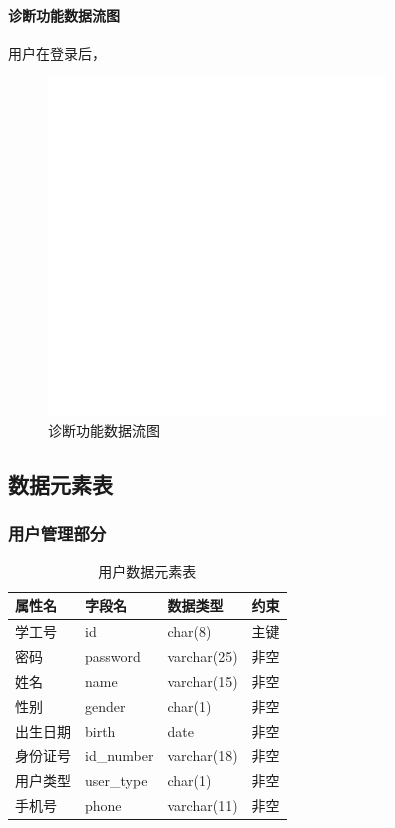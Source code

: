 \documentclass{article}
\begin{document}
\paragraph{诊断功能数据流图}

用户在登录后，

\begin{figure}[H]
    \centering
    \includegraphics[width=0.8\textwidth]{images/diagnosis_dataflow.png}
    \caption{诊断功能数据流图}
\end{figure}

\subsection{数据元素表}
\subsubsection{用户管理部分}

\begin{table}[H]
    \centering
    \begin{tabularx}{\textwidth}{|>{\raggedright\arraybackslash}X|>{\raggedright\arraybackslash}X|>{\raggedright\arraybackslash}X|>{\raggedright\arraybackslash}X|}
    \toprule
    \textbf{属性名} & \textbf{字段名} & \textbf{数据类型} & \textbf{约束} \\ \midrule
    学工号 & id & char(8) & 主键 \\ \midrule
    密码 & password & varchar(25) & 非空 \\ \midrule
    姓名 & name & varchar(15) & 非空 \\ \midrule
    性别 & gender & char(1) & 非空 \\ \midrule
    出生日期 & birth & date & 非空 \\ \midrule
    身份证号 & id\_number & varchar(18) & 非空 \\ \midrule
    用户类型 & user\_type & char(1) & 非空 \\ \midrule
    手机号 & phone & varchar(11) & 非空 \\ \bottomrule
    \end{tabularx}
    \caption{用户数据元素表}
    \label{tab:student_user_elements}
\end{table}
\end{document}
